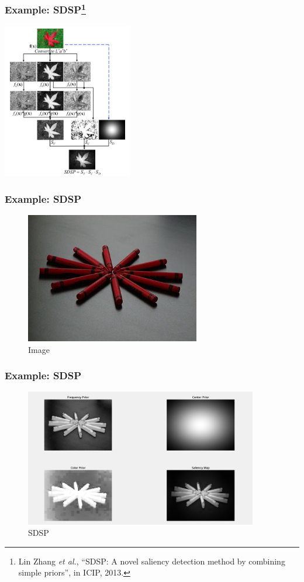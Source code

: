 \documentclass[notheorems,serif,table,compress]{beamer}  %
\begin{document}
\begin{frame}
\frametitle{Example: SDSP\footnote{Lin Zhang \textit{et al.}, ``SDSP: A novel saliency detection method by combining simple priors'', in ICIP, 2013.} }

\centering\includegraphics[width=5.7cm]{SDSP}
\end{frame}

\begin{frame}
\frametitle{Example: SDSP}
\begin{figure}
  \centering
\includegraphics[width=3in]{3.jpg}
  \caption{Image}
 \label{sdsp3}
  \end{figure}
\end{frame}

\begin{frame}
\frametitle{Example: SDSP}
\begin{figure}
  \centering
\includegraphics[width=4in]{sdsp4.png}
  \caption{SDSP}
 \label{sdsp3}
  \end{figure}
\end{frame}
\end{document}
